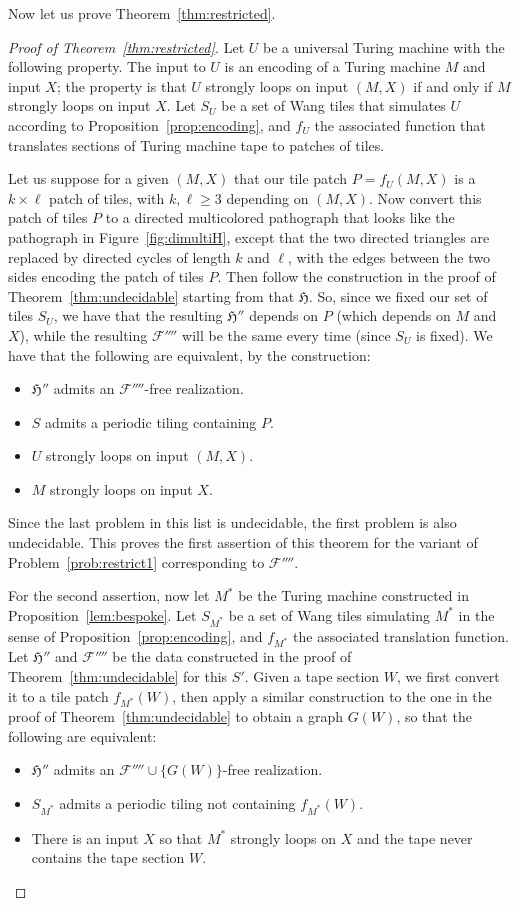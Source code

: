 \documentclass{article}
\newcommand{\Fc}{\mathcal{F}}
\newcommand{\Hf}{\mathfrak{H}}
\begin{document}
Now let us prove Theorem~\ref{thm:restricted}.
\begin{proof}[Proof of Theorem~\ref{thm:restricted}]
Let $U$ be a universal Turing machine with the following property. The input to $U$ is an encoding of a Turing machine $M$ and input $X$; the property is that $U$ strongly loops on input $(M, X)$ if and only if $M$ strongly loops on input $X$. Let $S_U$ be a set of Wang tiles that simulates $U$ according to Proposition~\ref{prop:encoding}, and $f_U$ the associated function that translates sections of Turing machine tape to patches of tiles.

Let us suppose for a given $(M, X)$ that our tile patch $P=f_U(M, X)$ is a $k\times \ell$ patch of tiles, with $k,\ell\ge 3$ depending on $(M, X)$. Now convert this patch of tiles $P$ to a directed multicolored pathograph that looks like the pathograph in Figure~\ref{fig:dimultiH}, except that the two directed triangles are replaced by directed cycles of length $k$ and $\ell$, with the edges between the two sides encoding the patch of tiles $P$. Then follow the construction in the proof of Theorem~\ref{thm:undecidable} starting from that $\Hf$. So, since we fixed our set of tiles $S_U$, we have that the resulting $\Hf''$ depends on $P$ (which depends on $M$ and $X$), while the resulting $\Fc''''$ will be the same every time (since $S_U$ is fixed). We have that the following are equivalent, by the construction:
\begin{itemize}
    \item $\Hf''$ admits an $\Fc''''$-free realization.
    \item $S$ admits a periodic tiling containing $P$.
    \item $U$ strongly loops on input $(M, X)$.
    \item $M$ strongly loops on input $X$.
\end{itemize}
Since the last problem in this list is undecidable, the first problem is also undecidable. This proves the first assertion of this theorem for the variant of Problem~\ref{prob:restrict1} corresponding to $\Fc''''$.

For the second assertion, now let $M^*$ be the Turing machine constructed in Proposition~\ref{lem:bespoke}. Let $S_{M^*}$ be a set of Wang tiles simulating $M^*$ in the sense of Proposition~\ref{prop:encoding}, and $f_{M^*}$ the associated translation function. Let $\Hf''$ and $\Fc''''$ be the data constructed in the proof of Theorem~\ref{thm:undecidable} for this $S'$. Given a tape section $W$, we first convert it to a tile patch $f_{M^*}(W)$, then apply a similar construction to the one in the proof of Theorem~\ref{thm:undecidable} to obtain a graph $G(W)$, so that the following are equivalent:
\begin{itemize}
    \item $\Hf''$ admits an $\Fc''''\cup\{G(W)\}$-free realization.
    \item $S_{M^*}$ admits a periodic tiling not containing $f_{M^*}(W)$.
    \item There is an input $X$ so that $M^*$ strongly loops on $X$ and the tape never contains the tape section $W$.
\end{itemize}


\end{proof}
\end{document}
